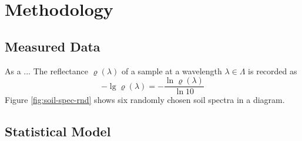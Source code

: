 
\section{Methodology}

\label{sec:methodology}
	
	\subsection{Measured Data}
	\label{ssec:measured-data}
	
		As a ...
		The reflectance $\varrho(\lambda)$ of a sample at a wavelength $\lambda \in \Lambda$ is recorded as
		\[
			-\lg \varrho(\lambda) = -\frac{\ln \varrho(\lambda)}{\ln 10}
		\]
		Figure \ref{fig:soil-spec-rnd} shows six randomly chosen soil spectra in a diagram.
		\begin{figure*}
			\centering
			
			\caption{Six near infrared soil spectra of randomly chosen soil samples obtained from the data set, where $\lambda$ is the wavelength and $\rho(\lambda)$ the corresponding reflectance and each colour refers to one sample}
			\label{fig:soil-spec-rnd}
		\end{figure*}
		
	

	\subsection{Statistical Model}
	\label{ssec:statistical-model}
	
	
	

	
	
